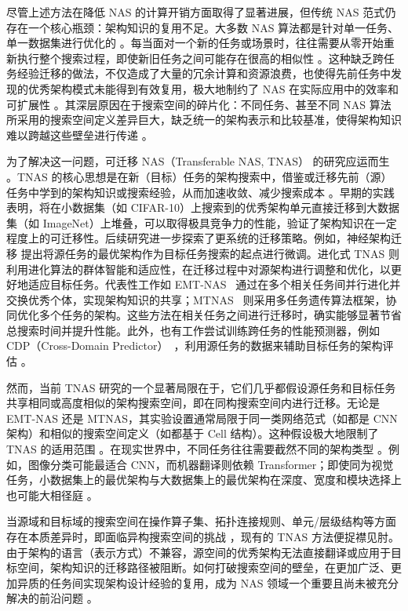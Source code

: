 \documentclass[../main.tex]{subfiles}
\begin{document}
尽管上述方法在降低 NAS 的计算开销方面取得了显著进展，但传统 NAS 范式仍存在一个核心瓶颈：架构知识的复用不足\cite{neuralarchitecturetransfer_lu_2021}。大多数 NAS 算法都是针对单一任务、单一数据集进行优化的 。每当面对一个新的任务或场景时，往往需要从零开始重新执行整个搜索过程，即使新旧任务之间可能存在很高的相似性 。这种缺乏跨任务经验迁移的做法，不仅造成了大量的冗余计算和资源浪费，也使得先前任务中发现的优秀架构模式未能得到有效复用，极大地制约了 NAS 在实际应用中的效率和可扩展性 。其深层原因在于搜索空间的碎片化：不同任务、甚至不同 NAS 算法所采用的搜索空间定义差异巨大\cite{neuralarchitecturesearch_elsken_2019}，缺乏统一的架构表示和比较基准\cite{nasbench101_ying_2019,natsbenchbenchmarking_dong_2022}，使得架构知识难以跨越这些壁垒进行传递 。

为了解决这一问题，可迁移 NAS（Transferable NAS, TNAS） 的研究应运而生 。TNAS 的核心思想是在新（目标）任务的架构搜索中，借鉴或迁移先前（源）任务中学到的架构知识或搜索经验，从而加速收敛、减少搜索成本 。早期的实践\cite{learningtransferablearchitectures_zoph_2018,progressiveneuralarchitecture_liu_2018}表明，将在小数据集（如 CIFAR-10）上搜索到的优秀架构单元直接迁移到大数据集（如 ImageNet）上堆叠，可以取得极具竞争力的性能，验证了架构知识在一定程度上的可迁移性。后续研究进一步探索了更系统的迁移策略。例如，神经架构迁移 提出将源任务的最优架构作为目标任务搜索的起点进行微调。进化式 TNAS 则利用进化算法的群体智能和适应性，在迁移过程中对源架构进行调整和优化，以更好地适应目标任务。代表性工作如 EMT-NAS~\cite{emtnastransferring_liao_2023} 通过在多个相关任务间并行进化并交换优秀个体，实现架构知识的共享；MTNAS~\cite{evolutionarymultitaskconvolutional_zhou_2024} 则采用多任务遗传算法框架，协同优化多个任务的架构。这些方法在相关任务之间进行迁移时，确实能够显著节省总搜索时间并提升性能。此外，也有工作尝试训练跨任务的性能预测器，例如 CDP（Cross-Domain Predictor）~\cite{bridgegaparchitecture_liu_2022}，利用源任务的数据来辅助目标任务的架构评估 。

然而，当前 TNAS 研究的一个显著局限在于，它们几乎都假设源任务和目标任务共享相同或高度相似的架构搜索空间，即在同构搜索空间内进行迁移\cite{emtnastransferring_liao_2023,evolutionarymultitaskconvolutional_zhou_2024}。无论是 EMT-NAS 还是 MTNAS，其实验设置通常局限于同一类网络范式（如都是 CNN 架构）和相似的搜索空间定义（如都基于 Cell 结构）。这种假设极大地限制了 TNAS 的适用范围 。在现实世界中，不同任务往往需要截然不同的架构类型 。例如，图像分类可能最适合 CNN，而机器翻译则依赖 Transformer；即使同为视觉任务，小数据集上的最优架构与大数据集上的最优架构在深度、宽度和模块选择上也可能大相径庭 。

当源域和目标域的搜索空间在操作算子集、拓扑连接规则、单元/层级结构等方面存在本质差异时，即面临异构搜索空间的挑战 ，现有的 TNAS 方法便捉襟见肘。由于架构的语言（表示方式）不兼容，源空间的优秀架构无法直接翻译或应用于目标空间\cite{nasbench101_ying_2019,natsbenchbenchmarking_dong_2022,dartsdifferentiablearchitecture_liu_2019}，架构知识的迁移路径被阻断。如何打破搜索空间的壁垒，在更加广泛、更加异质的任务间实现架构设计经验的复用，成为 NAS 领域一个重要且尚未被充分解决的前沿问题 。
\end{document}
